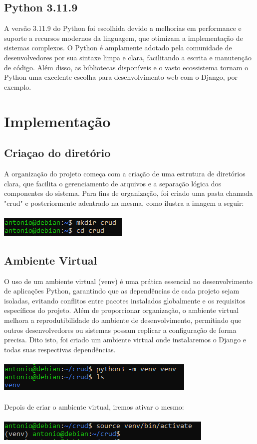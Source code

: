\documentclass[11pt]{article} %
\begin{document}
\subsection{Python 3.11.9}
A versão 3.11.9 do Python foi escolhida devido a melhorias em performance e suporte a recursos modernos da linguagem, que otimizam a implementação de sistemas complexos. O Python é amplamente adotado pela comunidade de desenvolvedores por sua sintaxe limpa e clara, facilitando a escrita e manutenção de código. Além disso, as bibliotecas disponíveis e o vasto ecossistema tornam o Python uma excelente escolha para desenvolvimento web com o Django, por exemplo.

\maketitle
\section{Implementação}
\subsection{Criaçao do diretório}
A organização do projeto começa com a criação de uma estrutura de diretórios clara, que facilita o gerenciamento de arquivos e a separação lógica dos componentes do sistema. Para fins de organização, foi criado uma pasta chamada "crud" e posteriormente adentrado na mesma, como ilustra a imagem a seguir:\\\\
\includegraphics[]{images/s1.PNG}
\subsection{Ambiente Virtual}
O uso de um ambiente virtual (venv) é uma prática essencial no desenvolvimento de aplicações Python, garantindo que as dependências de cada projeto sejam isoladas, evitando conflitos entre pacotes instalados globalmente e os requisitos específicos do projeto. Além de proporcionar organização, o ambiente virtual melhora a reprodutibilidade do ambiente de desenvolvimento, permitindo que outros desenvolvedores ou sistemas possam replicar a configuração de forma precisa. Dito isto, foi criado um ambiente virtual onde instalaremos o Django e todas suas respectivas dependências.\\\\
\includegraphics[]{images/s2.PNG}\\\\
Depois de criar o ambiente virtual, iremos ativar o mesmo:\\\\
\includegraphics[]{images/s3.PNG}
\end{document}
